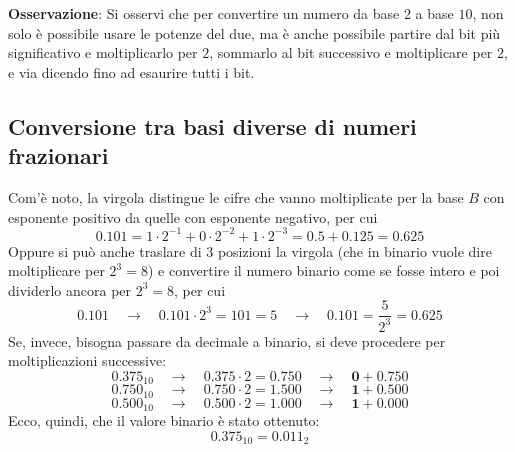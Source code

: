\documentclass[a4paper]{extarticle}
\begin{document}
\vspace{1em}
\noindent
\textbf{Osservazione}: Si osservi che per convertire un numero da base $2$ a base $10$, non solo è possibile usare le potenze del due, ma è anche possibile partire dal bit più significativo e moltiplicarlo per $2$, sommarlo al bit successivo e moltiplicare per $2$, e via dicendo fino ad esaurire tutti i bit.

\vspace{1em}
\noindent
\subsection{Conversione tra basi diverse di numeri frazionari}
Com'è noto, la virgola distingue le cifre che vanno moltiplicate per la base $B$ con esponente positivo da quelle con esponente negativo, per cui
\[0.101 = 1 \cdot 2^{-1} + 0 \cdot 2^{-2} + 1 \cdot 2^{-3} = 0.5 + 0.125 = 0.625\]
Oppure si può anche traslare di $3$ posizioni la virgola (che in binario vuole dire moltiplicare per $2^3=8$) e convertire il numero binario come se fosse intero e poi dividerlo ancora per $2^3=8$, per cui
\[0.101 \hspace{1em} \rightarrow \hspace{1em} 0.101 \cdot 2^3 = 101 = 5 \hspace{1em} \rightarrow \hspace{1em} 0.101 = \frac{5}{2^3} = 0.625\]
Se, invece, bisogna passare da decimale a binario, si deve procedere per moltiplicazioni successive:
\[0.375_10 \hspace{1em} \rightarrow \hspace{1em} 0.375 \cdot 2 = 0.750 \hspace{1em} \rightarrow \hspace{1em} \textbf{0} + 0.750\]
\[0.750_10 \hspace{1em} \rightarrow \hspace{1em} 0.750 \cdot 2 = 1.500 \hspace{1em} \rightarrow \hspace{1em} \textbf{1} + 0.500\]
\[0.500_10 \hspace{1em} \rightarrow \hspace{1em} 0.500 \cdot 2 = 1.000 \hspace{1em} \rightarrow \hspace{1em} \textbf{1} + 0.000\]
Ecco, quindi, che il valore binario è stato ottenuto:
\[0.375_10 = 0.011_2\]
\end{document}
